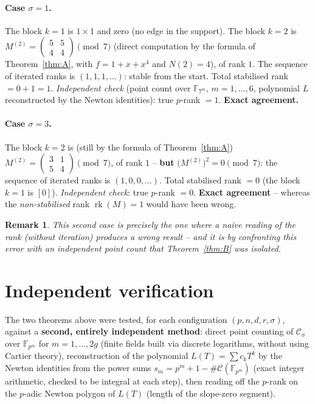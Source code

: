 \documentclass[11pt,a4paper]{article}
\newtheorem{remark}[theorem]{Remark}
\newcommand{\F}{\mathbb{F}}
\DeclareMathOperator{\rg}{rk}
\begin{document}
\paragraph{Case $\sigma=1$.} The block $k=1$ is $1\times1$ and zero (no edge in
the support). The block $k=2$ is
$M^{(2)}=\left(\begin{smallmatrix}5&5\\4&4\end{smallmatrix}\right)\pmod7$
(direct computation by the formula of Theorem~\ref{thm:A}, with $f=1+x+x^4$ and
$N(2)=4$), of rank $1$. The sequence of iterated ranks is $(1,1,1,\dots)$:
stable from the start. Total
stabilised rank $=0+1=1$. \emph{Independent check} (point count over $\F_{7^m}$,
$m=1,\dots,6$, polynomial $L$ reconstructed by the Newton identities): true
$p$-rank $=1$. \textbf{Exact agreement.}

\paragraph{Case $\sigma=3$.} The block $k=2$ is (still by the formula of
Theorem~\ref{thm:A})
$M^{(2)}=\left(\begin{smallmatrix}3&1\\5&4\end{smallmatrix}\right)\pmod7$, of rank
$1$ -- \textbf{but} $\big(M^{(2)}\big)^2=0\pmod7$: the sequence of iterated
ranks is $(1,0,0,\dots)$. Total stabilised rank $=0$ (the block $k=1$ is $[0]$). \emph{Independent check}: true
$p$-rank $=0$. \textbf{Exact agreement} -- whereas the \emph{non-stabilised} rank
$\rg(M)=1$ would have been wrong.
\begin{remark}
This second case is precisely the one where a naive reading of the rank (without
iteration) produces a wrong result -- and it is by confronting this error with
an independent point count that Theorem~\ref{thm:B} was isolated.
\end{remark}

\section{Independent verification}

The two theorems above were tested, for each configuration $(p,n,d,r,\sigma)$,
against a \textbf{second, entirely independent method}: direct point counting of
$\mathcal{C}_\sigma$ over $\F_{p^m}$ for $m=1,\dots,2g$ (finite fields built via
discrete logarithms, without using Cartier theory), reconstruction of the
polynomial $L(T)=\sum c_kT^k$ by the Newton identities from the power sums
$s_m=p^m+1-\#\mathcal{C}(\F_{p^m})$ (exact integer arithmetic, checked to be
integral at each step), then reading off the $p$-rank on the $p$-adic Newton
polygon of $L(T)$ (length of the slope-zero segment).
\end{document}
